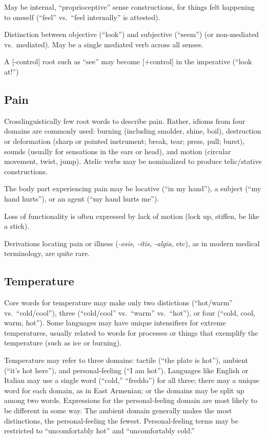 \documentclass[11pt]{article}
\begin{document}
May be internal, ``proprioceptive'' sense constructions, for things
felt happening to oneself (``feel'' vs.\ ``feel internally'' is
attested). 

Distinction between objective (``look'') and subjective (``seem'') (or
non-mediated vs.\ mediated).  May be a single mediated verb across all
senses.

A [-control] root such as ``see'' may become [+control] in the
imperative (``look at!'')


\subsection{Pain}
Crosslinguistically few root words to describe pain.  Rather, idioms
from four domains are commonly used: burning (including smolder,
shine, boil), destruction or deformation (sharp or pointed instrument;
break, tear; press, pull; burst), sounds (usually for sensations in
the ears or head), and motion (circular movement, twist, jump).
Atelic verbs may be nominalized to produce telic/stative
constructions.

The body part experiencing pain may be locative (``in my hand''), a
subject (``my hand hurts''), or an agent (``my hand hurts me'').

Loss of functionality is often expressed by lack of motion (lock up,
stiffen, be like a stick).

Derivations locating pain or illness (\textit{-osis, -itis, -algia,}
etc), as in modern medical terminology, are quite rare.

\subsection{Temperature}
Core words for temperature may make only two distictions (``hot/warm''
vs.\ ``cold/cool''), three (``cold/cool'' vs.\ ``warm'' vs.\ ``hot''),
or four (``cold, cool, warm, hot''). Some languages may have unique
intensifiers for extreme temperatures, usually related to words for
processes or things that exemplify the temperature (such as ice or
burning).

Temperature may refer to three domains: tactile (``the plate is
hot''), ambient (``it's hot here''), and personal-feeling (``I am
hot'').  Languages like English or Italian may use a single word
(``cold,'' ``freddo'') for all three; there may a unique word for each
domain, as in East Armenian; or the domains may be split up among two
words.  Expressions for the personal-feeling domain are most likely to
be different in some way.  The ambient domain generally makes the most
distinctions, the personal-feeling the fewest.  Personal-feeling terms
may be restricted to ``uncomfortably hot'' and ``uncomfortably cold.''
\end{document}
